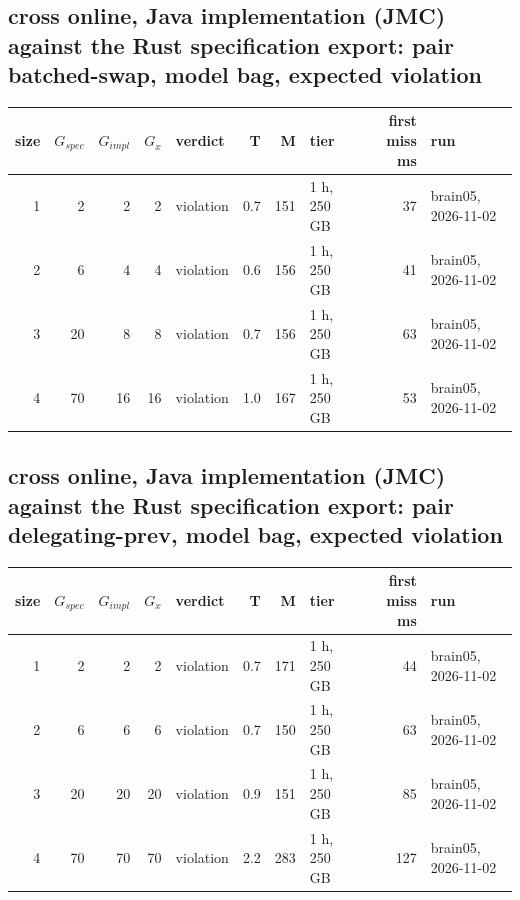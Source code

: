 \documentclass[10pt]{article}
\begin{document}
\subsection*{cross online, Java implementation (JMC) against the Rust specification export: pair \textsf{batched-swap}, model bag, expected violation}
\begin{longtable}{@{}rrrrlrrlrl@{}}
\toprule
size & $G_{\mathit{spec}}$ & $G_{\mathit{impl}}$ & $G_x$ & verdict & T & M & tier & first miss ms & run \\
\midrule
\endhead
\color{red} 1 & 2 & 2 & 2 & violation & 0.7 & 151 & 1 h, 250 GB & 37 & brain05, 2026-11-02 \\
\color{red} 2 & 6 & 4 & 4 & violation & 0.6 & 156 & 1 h, 250 GB & 41 & brain05, 2026-11-02 \\
\color{red} 3 & 20 & 8 & 8 & violation & 0.7 & 156 & 1 h, 250 GB & 63 & brain05, 2026-11-02 \\
\color{red} 4 & 70 & 16 & 16 & violation & 1.0 & 167 & 1 h, 250 GB & 53 & brain05, 2026-11-02 \\
\bottomrule
\end{longtable}
\subsection*{cross online, Java implementation (JMC) against the Rust specification export: pair \textsf{delegating-prev}, model bag, expected violation}
\begin{longtable}{@{}rrrrlrrlrl@{}}
\toprule
size & $G_{\mathit{spec}}$ & $G_{\mathit{impl}}$ & $G_x$ & verdict & T & M & tier & first miss ms & run \\
\midrule
\endhead
\color{red} 1 & 2 & 2 & 2 & violation & 0.7 & 171 & 1 h, 250 GB & 44 & brain05, 2026-11-02 \\
\color{red} 2 & 6 & 6 & 6 & violation & 0.7 & 150 & 1 h, 250 GB & 63 & brain05, 2026-11-02 \\
\color{red} 3 & 20 & 20 & 20 & violation & 0.9 & 151 & 1 h, 250 GB & 85 & brain05, 2026-11-02 \\
\color{red} 4 & 70 & 70 & 70 & violation & 2.2 & 283 & 1 h, 250 GB & 127 & brain05, 2026-11-02 \\
\bottomrule
\end{longtable}
\end{document}
